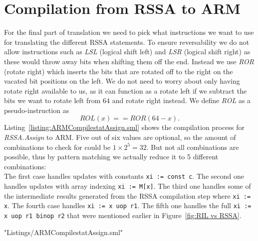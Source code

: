 \section{Compilation from RSSA to ARM}
For the final part of translation we need to pick what instructions we want to use for translating the different RSSA statements.
To ensure reversability we do not allow instructions such as \emph{LSL} (logical shift left) and \emph{LSR} (logical shift right) as these would throw away bits when shifting them off the end.
Instead we use \emph{ROR} (rotate right) which inserts the bits that are rotated off to the right on the vacated bit positions on the left.
We do not need to worry about only having rotate right available to us, as it can function as a rotate left if we subtract the bits we want to rotate left from $64$ and rotate right instead.
We define \emph{ROL} as a pseudo-instruction as
\begin{equation*}
  ROL(x) == ROR(64-x).
\end{equation*}
Listing~\ref{listing:ARMCompilestatAssign.sml} shows the compilation process for \emph{RSSA.Assign} to ARM.
Five out of six values are optional, so the amount of combinations to check for could be $1 \times 2^5 = 32$.
But not all combinations are possible, thus by pattern matching we actually reduce it to 5 different combinations:\\
The first case handles updates with constants \lstinline{xi := const c}.
The second one handles updates with array indexing \lstinline{xi := M[x]}.
The third one handles some of the intermediate results generated from the RSSA compilation step where \lstinline{xi := x}.
The fourth case handles \lstinline{xi := x uop r1}.
The fifth one handles the full \lstinline{xi := x uop r1 binop r2} that were mentioned earlier in Figure~\ref{fig:RIL vs RSSA}.

 {"Listings/ARMCompilestatAssign.sml"}

